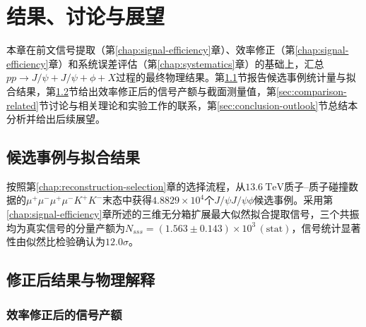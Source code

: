\chapter{结果、讨论与展望}
\label{chap:results}

本章在前文信号提取（第\ref{chap:signal-efficiency}章）、效率修正（第\ref{chap:signal-efficiency}章）和系统误差评估（第\ref{chap:systematics}章）的基础上，汇总$pp \to J/\psi + J/\psi + \phi + X$过程的最终物理结果。第\ref{sec:final-candidates-fit}节报告候选事例统计量与拟合结果，第\ref{sec:corrected-results-interp}节给出效率修正后的信号产额与截面测量值，第\ref{sec:comparison-related}节讨论与相关理论和实验工作的联系，第\ref{sec:conclusion-outlook}节总结本分析并给出后续展望。

\section{候选事例与拟合结果}
\label{sec:final-candidates-fit}

按照第\ref{chap:reconstruction-selection}章的选择流程，从$\SI{13.6}{\tera\eV}$质子--质子碰撞数据的$\mu^+\mu^-\mu^+\mu^-K^+K^-$末态中获得$4.8829\times10^4$个$J/\psi J/\psi \phi$候选事例。采用第\ref{chap:signal-efficiency}章所述的三维无分箱扩展最大似然拟合提取信号，三个共振均为真实信号的分量产额为$N_{sss}=(1.563\pm0.143)\times10^3\,(\mathrm{stat})$，信号统计显著性由似然比检验确认为$12.0\sigma$。


\section{修正后结果与物理解释}
\label{sec:corrected-results-interp}

\subsection{效率修正后的信号产额}

